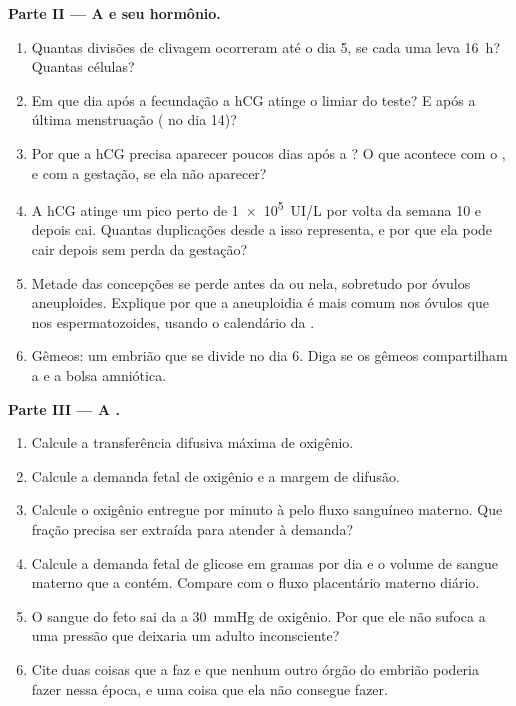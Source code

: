 \begin{problem}
\medskip
\noindent\textbf{Parte II --- A  e seu hormônio.}
\begin{enumerate}[resume]
  \item Quantas divisões de clivagem ocorreram até o dia 5, se cada uma
        leva \qty{16}{h}? Quantas células?
  \item Em que dia após a fecundação a hCG atinge o limiar do teste? E
        após a última menstruação ( no dia 14)?
  \item Por que a hCG precisa aparecer poucos dias após a ?
        O que acontece com o , e com a gestação, se ela não
        aparecer?
  \item A hCG atinge um pico perto de \qty{1e5}{UI/L} por volta da
        semana 10 e depois cai. Quantas duplicações desde a 
        isso representa, e por que ela pode cair depois sem perda da
        gestação?
  \item Metade das concepções se perde antes da  ou nela,
        sobretudo por óvulos aneuploides. Explique por que a
        aneuploidia é mais comum nos óvulos que nos espermatozoides,
        usando o calendário da .
  \item Gêmeos: um embrião que se divide no dia 6. Diga se os gêmeos
        compartilham a  e a bolsa amniótica.
\end{enumerate}

\medskip
\noindent\textbf{Parte III --- A .}
\begin{enumerate}[resume]
  \item Calcule a transferência difusiva máxima de oxigênio.
  \item Calcule a demanda fetal de oxigênio e a margem de difusão.
  \item Calcule o oxigênio entregue por minuto à  pelo fluxo
        sanguíneo materno. Que fração precisa ser extraída para atender
        à demanda?
  \item Calcule a demanda fetal de glicose em gramas por dia e o volume
        de sangue materno que a contém. Compare com o fluxo placentário
        materno diário.
  \item O sangue do feto sai da  a \qty{30}{mmHg} de oxigênio.
        Por que ele não sufoca a uma pressão que deixaria um adulto
        inconsciente?
  \item Cite duas coisas que a  faz e que nenhum outro órgão do
        embrião poderia fazer nessa época, e uma coisa que ela não
        consegue fazer.
\end{enumerate}


\end{problem}
